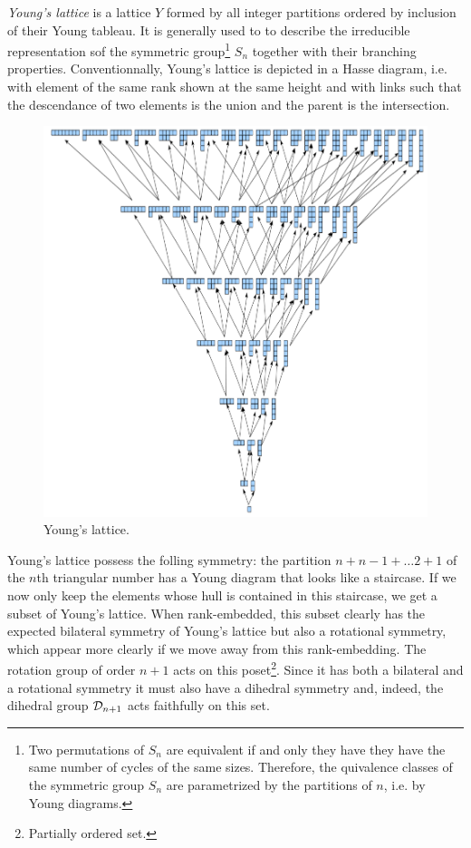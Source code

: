             \emph{Young's lattice} is a lattice $Y$ formed by all integer partitions ordered by inclusion of their Young tableau. It is generally used to to describe the irreducible representation sof the symmetric group\footnote{Two permutations of $S_n$ are equivalent if and only they have they have the same number of cycles of the same sizes. Therefore, the quivalence classes of the symmetric group $S_n$ are parametrized by the partitions of $n$, i.e. by Young diagrams.} $S_n$ together with their branching properties. Conventionnally, Young's lattice is depicted in a Hasse diagram, i.e. with element of the same rank shown at the same height and with links such that the descendance of two elements is the union and the parent is the intersection.

            \begin{figure}[H]
                \centering
                \includegraphics[scale=0.45]{Pictures/youngslattice.png}
                \caption{Young's lattice.}
            \end{figure}

            Young's lattice possess the folling symmetry: the partition $n+n-1+\dots2+1$ of the $n$th triangular number has a Young diagram that looks like a staircase. If we now only keep the elements whose hull is contained in this staircase, we get a subset of Young's lattice. When rank-embedded, this subset clearly has the expected bilateral symmetry of Young's lattice but also a rotational symmetry, which appear more clearly if we move away from this rank-embedding. The rotation group of order $n+1$ acts on this poset\footnote{Partially ordered set.}. Since it has both a bilateral and a rotational symmetry it must also have a dihedral symmetry and, indeed, the dihedral group $\mathcal{D}_{n+1}$ acts faithfully on this set.

